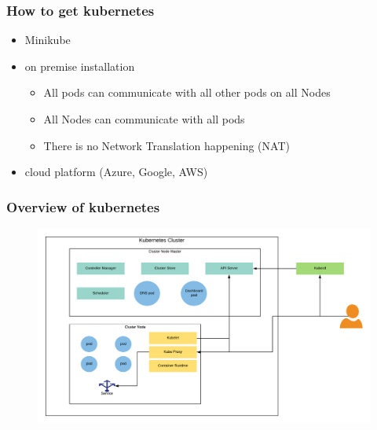\documentclass{beamer}
\begin{document}
\begin{frame}
\frametitle{How to get kubernetes}
    \begin{itemize}
        \item Minikube
        \item on premise installation
        \begin{itemize}
            \item All pods can communicate with all other pods on all Nodes
            \item All Nodes can communicate with all pods
            \item There is no Network Translation happening (NAT)
        \end{itemize}
        \item cloud platform (Azure, Google, AWS)
    \end{itemize}
    
\end{frame}

\begin{frame}
\frametitle{Overview of kubernetes}
\begin{figure}
\includegraphics[width=\linewidth]{images/KubernetesOverview.png}
\end{figure}

\end{frame}
\end{document}

